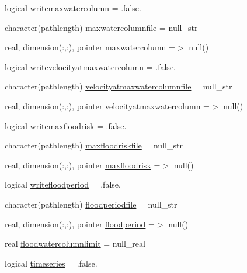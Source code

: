 \begin{DoxyCompactItemize}
\item 
logical \mbox{\hyperlink{structmodulerunoff_1_1t__output_a04859b9fabb8d0607e5102149f292c44}{writemaxwatercolumn}} = .false.
\item 
character(pathlength) \mbox{\hyperlink{structmodulerunoff_1_1t__output_aa4f03c238063b46f21bb3aec2d8fa33b}{maxwatercolumnfile}} = null\+\_\+str
\item 
real, dimension(\+:,\+:), pointer \mbox{\hyperlink{structmodulerunoff_1_1t__output_a2d3cb786984bbea9f61a212990c268b2}{maxwatercolumn}} =$>$ null()
\item 
logical \mbox{\hyperlink{structmodulerunoff_1_1t__output_ae89a0f219723d30f4f560c75c4de228d}{writevelocityatmaxwatercolumn}} = .false.
\item 
character(pathlength) \mbox{\hyperlink{structmodulerunoff_1_1t__output_afeb632672d69de17b747eea03457f8c8}{velocityatmaxwatercolumnfile}} = null\+\_\+str
\item 
real, dimension(\+:,\+:), pointer \mbox{\hyperlink{structmodulerunoff_1_1t__output_aff9721ade4664008b8fd0849502fb8a9}{velocityatmaxwatercolumn}} =$>$ null()
\item 
logical \mbox{\hyperlink{structmodulerunoff_1_1t__output_a8e5c8091108425d44bbbeffbb8c775ce}{writemaxfloodrisk}} = .false.
\item 
character(pathlength) \mbox{\hyperlink{structmodulerunoff_1_1t__output_a3a4e57d632d789e2a2cd1b71b4f2d3ca}{maxfloodriskfile}} = null\+\_\+str
\item 
real, dimension(\+:,\+:), pointer \mbox{\hyperlink{structmodulerunoff_1_1t__output_ad26a75e1953106a325cc1fa123e672e5}{maxfloodrisk}} =$>$ null()
\item 
logical \mbox{\hyperlink{structmodulerunoff_1_1t__output_aa3ba74df801ca126dc1cbc29625a996f}{writefloodperiod}} = .false.
\item 
character(pathlength) \mbox{\hyperlink{structmodulerunoff_1_1t__output_aa678103060413a6a16290cc26bb566c5}{floodperiodfile}} = null\+\_\+str
\item 
real, dimension(\+:,\+:), pointer \mbox{\hyperlink{structmodulerunoff_1_1t__output_a20401a47ab8361326297617052aaf236}{floodperiod}} =$>$ null()
\item 
real \mbox{\hyperlink{structmodulerunoff_1_1t__output_ac4f5be0267d9768df25bfab1e3335cb3}{floodwatercolumnlimit}} = null\+\_\+real
\item 
logical \mbox{\hyperlink{structmodulerunoff_1_1t__output_aa617351d4b7bc7858f28907b1224c84c}{timeseries}} = .false.
\item 

\end{DoxyCompactItemize}
